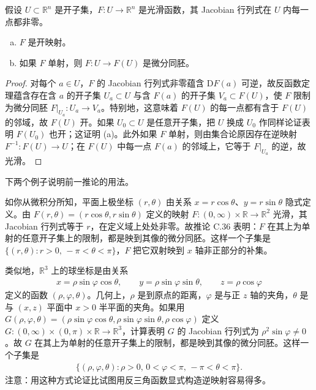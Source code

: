 \documentclass[../../main.tex]{subfiles}
\begin{document}
\begin{corollary}\label{corollary:appC-open-map}
假设 $U\subset\mathbb R^n$ 是开子集，$F:U\to\mathbb R^n$ 是光滑函数，其 Jacobian 行列式在 $U$ 内每一点都非零。
\begin{enumerate}[(a)]
\item $F$ 是开映射。
\item 如果 $F$ 单射，则 $F:U\to F(U)$ 是微分同胚。
\end{enumerate}
\end{corollary}

\begin{proof}
对每个 $a\in U$，$F$ 的 Jacobian 行列式非零蕴含 $\mathrm{D}F(a)$ 可逆，故反函数定理蕴含存在含 $a$ 的开子集 $U_a\subset U$ 与含 $F(a)$ 的开子集 $V_a\subset F(U)$，使 $F$ 限制为微分同胚 $F|_{U_a}:U_a\to V_a$。特别地，这意味着 $F(U)$ 的每一点都有含于 $F(U)$ 的邻域，故 $F(U)$ 开。如果 $U_0\subset U$ 是任意开子集，把 $U$ 换成 $U_0$ 作同样论证表明 $F(U_0)$ 也开；这证明 (a)。此外如果 $F$ 单射，则由集合论原因存在逆映射 $F^{-1}:F(U)\to U$；在 $F(U)$ 中每一点 $F(a)$ 的邻域上，它等于 $F|_{U_a}$ 的逆，故光滑。
\end{proof}

下两个例子说明前一推论的用法。

\begin{example}[极坐标]\label{example:appC-polar}
如你从微积分所知，平面上极坐标 $(r,\theta)$ 由关系 $x=r\cos\theta$、$y=r\sin\theta$ 隐式定义。由 $F(r,\theta)=(r\cos\theta,r\sin\theta)$ 定义的映射 $F:(0,\infty)\times\mathbb R\to\mathbb R^2$ 光滑，其 Jacobian 行列式等于 $r$，在定义域上处处非零。故推论 C.36 表明：$F$ 在其上为单射的任意开子集上的限制，都是映到其像的微分同胚。这样一个子集是 $\{(r,\theta):r>0,\,-\pi<\theta<\pi\}$，$F$ 把它双射映到 $x$ 轴非正部分的补集。
\end{example}

\begin{example}[球坐标]\label{example:appC-spherical}
类似地，$\mathbb R^3$ 上的球坐标是由关系
\begin{align*}
x=\rho\sin\varphi\cos\theta,\qquad y=\rho\sin\varphi\sin\theta,\qquad z=\rho\cos\varphi
\end{align*}
定义的函数 $(\rho,\varphi,\theta)$。几何上，$\rho$ 是到原点的距离，$\varphi$ 是与正 $z$ 轴的夹角，$\theta$ 是与 $(x,z)$ 平面中 $x>0$ 半平面的夹角。如果用 $G(\rho,\varphi,\theta)=(\rho\sin\varphi\cos\theta,\rho\sin\varphi\sin\theta,\rho\cos\varphi)$ 定义 $G:(0,\infty)\times(0,\pi)\times\mathbb R\to\mathbb R^3$，计算表明 $G$ 的 Jacobian 行列式为 $\rho^2\sin\varphi\neq0$。故 $G$ 在其上为单射的任意开子集上的限制，都是映到其像的微分同胚。这样一个子集是
\begin{align*}
\{(\rho,\varphi,\theta):\rho>0,\,0<\varphi<\pi,\,-\pi<\theta<\pi\}.
\end{align*}
注意：用这种方式论证比试图用反三角函数显式构造逆映射容易得多。
\end{example}
\end{document}
